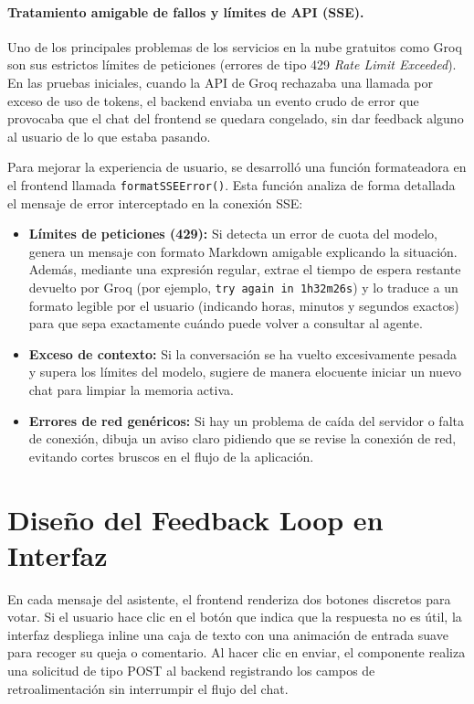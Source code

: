 \documentclass[12pt,a4paper,oneside]{report}
\begin{document}
\paragraph{Tratamiento amigable de fallos y límites de API (SSE).} Uno de los principales problemas de los servicios en la nube gratuitos como Groq son sus estrictos límites de peticiones (errores de tipo 429 \textit{Rate Limit Exceeded}). En las pruebas iniciales, cuando la API de Groq rechazaba una llamada por exceso de uso de tokens, el backend enviaba un evento crudo de error que provocaba que el chat del frontend se quedara congelado, sin dar feedback alguno al usuario de lo que estaba pasando.


Para mejorar la experiencia de usuario, se desarrolló una función formateadora en el frontend llamada \texttt{formatSSEError()}. Esta función analiza de forma detallada el mensaje de error interceptado en la conexión SSE:
\begin{itemize}
    \item \textbf{Límites de peticiones (429):} Si detecta un error de cuota del modelo, genera un mensaje con formato Markdown amigable explicando la situación. Además, mediante una expresión regular, extrae el tiempo de espera restante devuelto por Groq (por ejemplo, \texttt{try again in 1h32m26s}) y lo traduce a un formato legible por el usuario (indicando horas, minutos y segundos exactos) para que sepa exactamente cuándo puede volver a consultar al agente.
    \item \textbf{Exceso de contexto:} Si la conversación se ha vuelto excesivamente pesada y supera los límites del modelo, sugiere de manera elocuente iniciar un nuevo chat para limpiar la memoria activa.
    \item \textbf{Errores de red genéricos:} Si hay un problema de caída del servidor o falta de conexión, dibuja un aviso claro pidiendo que se revise la conexión de red, evitando cortes bruscos en el flujo de la aplicación.
\end{itemize}

\section{Diseño del Feedback Loop en Interfaz}

En cada mensaje del asistente, el frontend renderiza dos botones discretos para votar. Si el usuario hace clic en el botón que indica que la respuesta no es útil, la interfaz despliega inline una caja de texto con una animación de entrada suave para recoger su queja o comentario. Al hacer clic en enviar, el componente realiza una solicitud de tipo POST al backend registrando los campos de retroalimentación sin interrumpir el flujo del chat.
\end{document}
